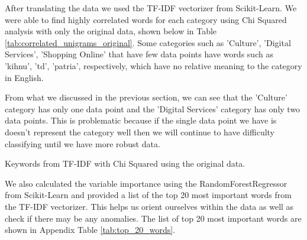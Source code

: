 After translating the data we used the TF-IDF vectorizer from Scikit-Learn. We were able to find highly correlated words for each category using Chi Squared analysis with only the original data, shown below in Table \ref{tab:correlated_unigrams_original}. Some categories such as 'Culture', 'Digital Services', 'Shopping Online' that have few data points have words such as 'kihnu', 'td', 'patria', respectively, which have no relative meaning to the category in English. 

From what we discussed in the previous section, we can see that the 'Culture' category has only one data point and the 'Digital Services' category has only two data points. This is problematic because if the single data point we have is doesn't represent the category well then we will continue to have difficulty classifying until we have more robust data.


\begin{table}[!ht]
\centering
\caption{Keywords from TF-IDF with Chi Squared using the original data.}

\label{tab:correlated_unigrams_original}
\end{table}


We also calculated the variable importance using the RandomForestRegressor from Scikit-Learn and provided a list of the top 20 most important words from the TF-IDF vectorizer. This helps us orient ourselves within the data as well as check if there may be any anomalies. The list of top 20 most important words are shown in Appendix Table \ref{tab:top_20_words}.



